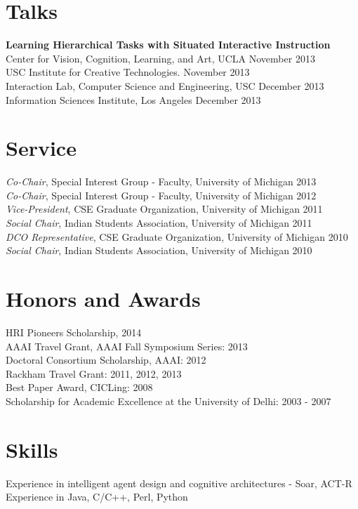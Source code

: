 \documentclass[margin,line,11pt]{res}
\begin{document}
\begin{resume}
\section{\sc Talks}
\textbf{Learning Hierarchical Tasks with Situated Interactive Instruction}\\
Center for Vision, Cognition, Learning, and Art, UCLA \hfill November 2013\\
USC Institute for Creative Technologies. \hfill November 2013\\
Interaction Lab, Computer Science and Engineering, USC \hfill December 2013\\
Information Sciences Institute, Los Angeles \hfill December 2013

\section{\sc Service}
\emph{Co-Chair}, Special Interest Group - Faculty, University of Michigan \hfill 2013 \\
\emph{Co-Chair}, Special Interest Group - Faculty, University of Michigan \hfill 2012 \\
\emph{Vice-President}, CSE Graduate Organization, University of Michigan \hfill 2011 \\
\emph{Social Chair}, Indian Students Association, University of Michigan \hfill 2011\\
\emph{DCO Representative}, CSE Graduate Organization, University of Michigan \hfill 2010 \\
\emph{Social Chair}, Indian Students Association, University of Michigan \hfill 2010

\section{\sc Honors and Awards} 
HRI Pioneers Scholarship, 2014\\
AAAI Travel Grant, AAAI Fall Symposium Series: 2013\\
Doctoral Consortium Scholarship, AAAI: 2012 \\
Rackham Travel Grant: 2011, 2012, 2013 \\
Best Paper Award, CICLing: 2008 \\
Scholarship for Academic Excellence at the University of Delhi: 2003 - 2007 

\section{\sc Skills}
Experience in intelligent agent design and cognitive architectures - Soar, ACT-R \\
Experience in Java, C/C++, Perl, Python


\end{resume}
\end{document}
